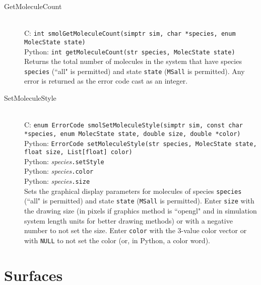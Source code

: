 \documentclass {book}
\newcommand {\ttt} {\texttt}
\begin{document}
\begin{description}
\item[GetMoleculeCount]
\hfill \\
C: \ttt{int smolGetMoleculeCount(simptr sim, char *species, enum MolecState state)}\\
Python: \ttt{int getMoleculeCount(str species, MolecState state)}\\
Returns the total number of molecules in the system that have species \ttt{species} (``all" is permitted) and state \ttt{state} (\ttt{MSall} is permitted). Any error is returned as the error code cast as an integer.

\item[SetMoleculeStyle]
\hfill \\
C: \ttt{enum ErrorCode smolSetMoleculeStyle(simptr sim, const char *species, enum MolecState state, double size, double *color)}\\
Python: \ttt{ErrorCode setMoleculeStyle(str species, MolecState state, float size, List[float] color)}\\
Python: \textit{species}\ttt{.setStyle}\\
Python: \textit{species}\ttt{.color}\\
Python: \textit{species}\ttt{.size}\\
Sets the graphical display parameters for molecules of species \ttt{species} (``all" is permitted) and state \ttt{state} (\ttt{MSall} is permitted). Enter \ttt{size} with the drawing size (in pixels if graphics method is ``opengl" and in simulation system length units for better drawing methods) or with a negative number to not set the size. Enter \ttt{color} with the 3-value color vector or with \ttt{NULL} to not set the color (or, in Python, a color word).

\end{description}

\section{Surfaces}
\end{document}

